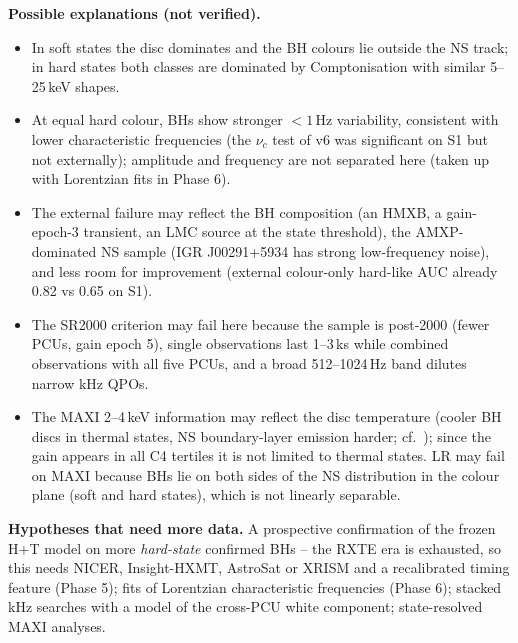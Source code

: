 \textbf{Possible explanations (not verified).}
\begin{itemize}
\item In soft states the disc dominates and the BH colours lie outside the NS track; in hard states both classes are dominated by
Comptonisation with similar 5--25\,keV shapes.
\item At equal hard colour, BHs show stronger $<1$\,Hz variability, consistent with lower characteristic frequencies (the $\nu_c$ test of
v6 was significant on S1 but not externally); amplitude and frequency are not separated here (taken up with Lorentzian fits in
Phase 6).
\item The external failure may reflect the BH composition (an HMXB, a gain-epoch-3 transient, an LMC source at the state threshold),
the AMXP-dominated NS sample (IGR J00291+5934 has strong low-frequency noise), and less room for improvement (external colour-only
hard-like AUC already 0.82 vs 0.65 on S1).
\item The SR2000 criterion may fail here because the sample is post-2000 (fewer PCUs, gain epoch 5), single observations last 1--3\,ks
while \citet{SunyaevRevnivtsev2000} combined observations with all five PCUs, and a broad 512--1024\,Hz band dilutes narrow kHz QPOs.
\item The MAXI 2--4\,keV information may reflect the disc temperature (cooler BH discs in thermal states, NS boundary-layer emission
harder; cf.\ \citealp{DoneGierlinski2003}); since the gain appears in all C4 tertiles it is not limited to thermal states. LR may
fail on MAXI because BHs lie on both sides of the NS distribution in the colour plane (soft and hard states), which is not linearly
separable.
\end{itemize}

\textbf{Hypotheses that need more data.} A prospective confirmation of the frozen H+T model on more \emph{hard-state} confirmed BHs
-- the RXTE era is exhausted, so this needs NICER, Insight-HXMT, AstroSat or XRISM and a recalibrated timing feature (Phase 5); fits of
Lorentzian characteristic frequencies (Phase 6); stacked kHz searches with a model of the cross-PCU white component; state-resolved
MAXI analyses.

